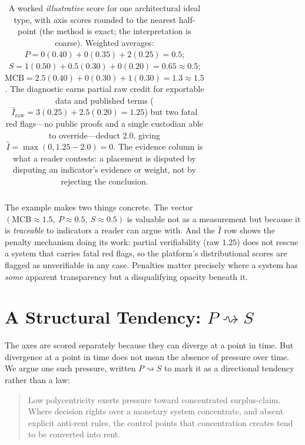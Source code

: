 \documentclass[11pt]{article}
\theoremstyle{definition}
\newcommand{\Iax}{\ensuremath{\hat{I}}}
\begin{document}
\begin{table}[!ht]
\begin{tabularx}{\textwidth}{@{}p{1.6cm}p{4.4cm}Xc@{}}
\bottomrule
\end{tabularx}
\caption{A worked \emph{illustrative} score for one architectural ideal type, with
axis scores rounded to the nearest half-point (the method is exact; the
interpretation is coarse). Weighted averages: $P = 0(0.40)+0(0.35)+2(0.25) = 0.5$;
$S = 1(0.50)+0.5(0.30)+0(0.20) = 0.65 \approx 0.5$; $\text{MCB} =
2.5(0.40)+0(0.30)+1(0.30) = 1.3 \approx 1.5$. The diagnostic earns partial raw credit
for exportable data and published terms ($\Iax_{\text{raw}} = 3(0.25)+2.5(0.20) =
1.25$) but two fatal red flags---no public proofs and a single custodian able to
override---deduct $2.0$, giving $\Iax = \max(0, 1.25-2.0) = 0$. The evidence column is
what a reader contests: a placement is disputed by disputing an indicator's evidence
or weight, not by rejecting the conclusion.}
\label{tab:worked}
\end{table}

The example makes two things concrete. The vector $(\text{MCB} \approx 1.5,\ P
\approx 0.5,\ S \approx 0.5)$ is valuable not as a measurement but because it is
\emph{traceable} to indicators a reader can argue with. And the $\Iax$ row shows the
penalty mechanism doing its work: partial verifiability (raw $1.25$) does not rescue a
system that carries fatal red flags, so the platform's distributional scores are
flagged as unverifiable in any case. Penalties matter precisely where a system has
\emph{some} apparent transparency but a disqualifying opacity beneath it.

\section{A Structural Tendency: \texorpdfstring{$P \rightsquigarrow S$}{P pressures S}}
\label{sec:causality}

The axes are scored separately because they can diverge at a point in time. But
divergence at a point in time does not mean the absence of pressure over time. We
argue one such pressure, written $P \rightsquigarrow S$ to mark it as a directional
tendency rather than a law:

\begin{quote}
Low polycentricity exerts pressure toward concentrated surplus-claim. Where decision
rights over a monetary system concentrate, and absent explicit anti-rent rules, the
control points that concentration creates tend to be converted into rent.
\end{quote}
\end{document}
